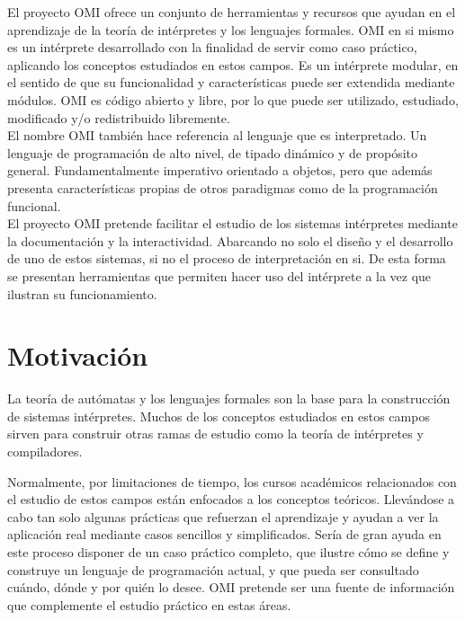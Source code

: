 

El proyecto OMI ofrece un conjunto de herramientas y recursos que ayudan en el aprendizaje 
de la teoría de intérpretes y los lenguajes formales. OMI en si mismo es un intérprete desarrollado 
con la finalidad de servir como caso práctico, aplicando los conceptos estudiados en 
estos campos. Es un intérprete modular, en el sentido de que su funcionalidad y características puede ser extendida mediante módulos.
OMI es código abierto y libre, por lo que puede ser utilizado, estudiado, modificado y/o redistribuido libremente.\\

El nombre OMI también hace referencia al lenguaje que es interpretado. Un lenguaje de programación de alto nivel, de tipado dinámico y de propósito general. Fundamentalmente 
imperativo orientado a objetos, pero que además presenta características propias de otros paradigmas como de la programación funcional. \\

El proyecto OMI pretende facilitar el estudio de los sistemas intérpretes mediante la documentación y la interactividad. Abarcando no solo el diseño y el desarrollo
de uno de estos sistemas, si no el proceso de interpretación en si. De esta forma se presentan herramientas que permiten hacer uso del intérprete a la vez que ilustran
su funcionamiento. 

\section{Motivación}
La teoría de autómatas y los lenguajes formales son la base para la construcción de sistemas intérpretes. Muchos de los conceptos estudiados 
en estos campos sirven para construir otras ramas de estudio como la teoría de intérpretes y compiladores. 

Normalmente, por limitaciones de tiempo, los cursos académicos relacionados con el estudio de estos campos están enfocados a los conceptos teóricos. 
Llevándose a cabo tan solo algunas prácticas que refuerzan el aprendizaje y ayudan a ver la aplicación real mediante casos sencillos y simplificados. 
Sería de gran ayuda en este proceso disponer de un caso práctico completo, que ilustre cómo se define y construye un lenguaje de programación actual, 
y que pueda ser consultado cuándo, dónde y por quién lo desee. OMI pretende ser una fuente de información que complemente el estudio práctico en estas áreas.\\

